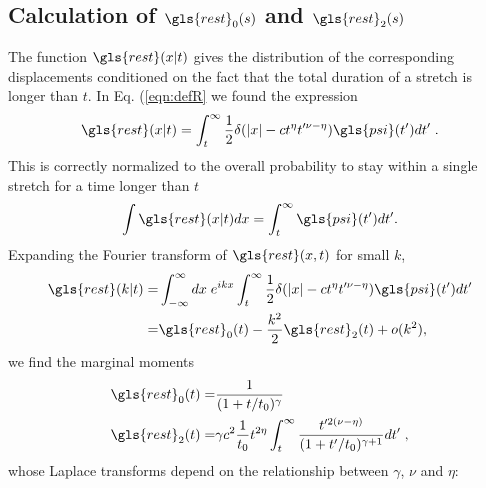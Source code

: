 \subsection*{Calculation of  $\gls{rest}_0(s)$ and $\gls{rest}_2(s)$}
The function $\gls{rest}(x|t)$ gives the distribution of
the corresponding displacements conditioned on the fact that the total duration of a stretch is longer than $t$. In Eq. (\ref{eqn:defR} we found the expression
%
\begin{equation}
 \gls{rest}(x|t) =  \int_t^\infty \frac{1}{2} \delta(|x| - c t^{\eta}t'^{\nu-\eta}) \gls{psi}(t') dt' \; .
\end{equation}
This is correctly normalized to the overall probability to stay within a single stretch for a time longer than $t$ 
\begin{equation}
 \int \gls{rest}(x|t)  dx = \int_t^\infty \gls{psi}(t') dt'.
\end{equation}
Expanding the Fourier transform of $\gls{rest}(x,t)$ for small $k$,
\begin{align}
\gls{rest}(k|t) =& \int_{-\infty}^{\infty} dx \; e^{ikx} \int_t^\infty \frac{1}{2} \delta(|x| - c t^{\eta}t'^{\nu-\eta}) \gls{psi}(t') dt' \nonumber \\
=& \gls{rest}_0(t) - \frac{k^2}{2} \gls{rest}_2(t) + o(k^2), 
\end{align}
we find the marginal moments
\begin{align}
\gls{rest}_0(t) =& \frac{1}{(1+t/t_0)^{\gamma}} \\
\gls{rest}_2(t) =& \gamma c^2 \frac{1 }{t_0} t^{2\eta} \int_t^\infty \frac{t'^{2(\nu-\eta)}}{(1+t'/t_0)^{\gamma+1}} dt' \; , 
\end{align}
whose Laplace transforms depend on the relationship between $\gamma$, $\nu$ and $\eta$: 

